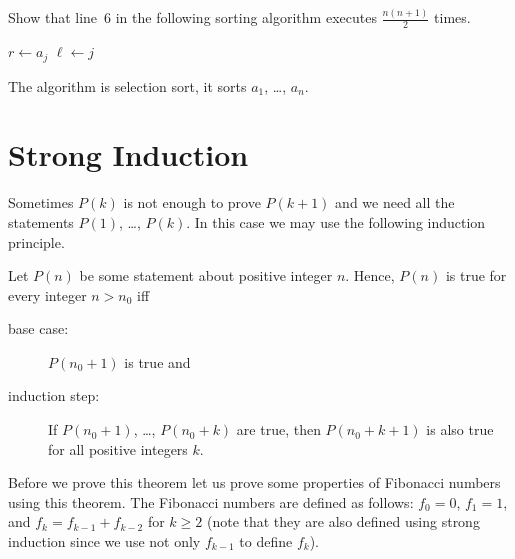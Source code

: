 \begin{exercise}
  Show that line~6 in the following sorting algorithm executes
  $\frac{n (n + 1)}{2}$ times.
  \begin{algorithm}
    \begin{algorithmic}[1]
              \State $r \gets a_j$
              \State $\ell \gets j$
            \EndIf
          \EndFor
        \EndFor
      \EndFunction
    \end{algorithmic}
    \caption{The algorithm is selection sort, it sorts $a_1$, \dots, $a_n$.}
  \end{algorithm}
\end{exercise}



\section{Strong Induction}

Sometimes $P(k)$ is not enough to prove $P(k + 1)$ and we need all the
statements $P(1)$, \dots, $P(k)$. In this case we may use the following
induction  principle.

\begin{theorem}
\label{theorem:strong-induction}
  Let $P(n)$ be some statement about positive integer $n$.
  Hence, $P(n)$ is true for every integer $n > n_0$ iff
  \begin{description}
    \item[base case:] $P(n_0 + 1)$ is true and
    \item[induction step:] If $P(n_0 + 1)$, \dots, $P(n_0 + k)$ are true, then
      $P(n_0 + k + 1)$ is also true for all positive integers $k$.
  \end{description}
\end{theorem}

Before we prove this theorem let us prove some properties of Fibonacci numbers
using this theorem. The Fibonacci numbers are defined as follows:
$f_0 = 0$, $f_1 = 1$, and $f_k = f_{k - 1} + f_{k - 2}$ for $k \ge 2$ (note
that they are also defined using strong induction since we use not only
$f_{k - 1}$ to define $f_k$).

